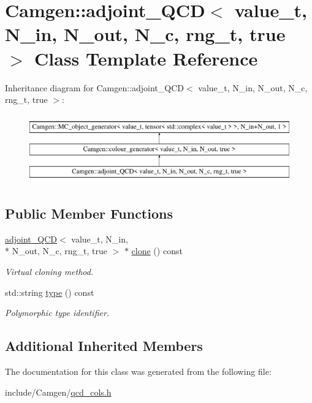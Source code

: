\hypertarget{a00005}{\section{Camgen\-:\-:adjoint\-\_\-\-Q\-C\-D$<$ value\-\_\-t, N\-\_\-in, N\-\_\-out, N\-\_\-c, rng\-\_\-t, true $>$ Class Template Reference}
\label{a00005}
}
Inheritance diagram for Camgen\-:\-:adjoint\-\_\-\-Q\-C\-D$<$ value\-\_\-t, N\-\_\-in, N\-\_\-out, N\-\_\-c, rng\-\_\-t, true $>$\-:\begin{figure}[H]
\begin{center}
\leavevmode
\includegraphics[height=3.000000cm]{a00005}
\end{center}
\end{figure}
\subsection*{Public Member Functions}
\begin{DoxyCompactItemize}
\item 
\hypertarget{a00005_af29fb05f782cda8f4b0f4ee9f49d9589}{\hyperlink{a00003}{adjoint\-\_\-\-Q\-C\-D}$<$ value\-\_\-t, N\-\_\-in, \\*
N\-\_\-out, N\-\_\-c, rng\-\_\-t, true $>$ $\ast$ \hyperlink{a00005_af29fb05f782cda8f4b0f4ee9f49d9589}{clone} () const }\label{a00005_af29fb05f782cda8f4b0f4ee9f49d9589}

\begin{DoxyCompactList}\small\item\em Virtual cloning method. \end{DoxyCompactList}\item 
\hypertarget{a00005_a6bf5e94c39857c3cda0e5f7631d95fc5}{std\-::string \hyperlink{a00005_a6bf5e94c39857c3cda0e5f7631d95fc5}{type} () const }\label{a00005_a6bf5e94c39857c3cda0e5f7631d95fc5}

\begin{DoxyCompactList}\small\item\em Polymorphic type identifier. \end{DoxyCompactList}\end{DoxyCompactItemize}
\subsection*{Additional Inherited Members}


The documentation for this class was generated from the following file\-:\begin{DoxyCompactItemize}
\item 
include/\-Camgen/\hyperlink{a00724}{qcd\-\_\-cols.\-h}\end{DoxyCompactItemize}
